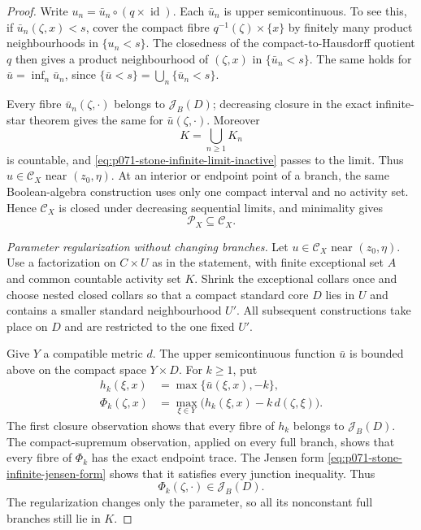 \begin{proof}
Write \(u_n=\bar u_n\circ(q\times\operatorname{id})\).  Each
\(\bar u_n\) is upper semicontinuous.  To see this, if
\(\bar u_n(\zeta,x)<s\), cover the compact fibre
\(q^{-1}(\zeta)\times\{x\}\) by finitely many product neighbourhoods in
\(\{u_n<s\}\).  The closedness of the compact-to-Hausdorff quotient
\(q\) then gives a product neighbourhood of \((\zeta,x)\) in
\(\{\bar u_n<s\}\).  The same holds for
\(\bar u=\inf_n\bar u_n\), since
\(\{\bar u<s\}=\bigcup_n\{\bar u_n<s\}\).

Every fibre \(\bar u_n(\zeta,\cdot)\) belongs to
\(\mathscr J_B(D)\); decreasing closure in the exact infinite-star
theorem gives the same for \(\bar u(\zeta,\cdot)\).  Moreover
\[
                         K=\bigcup_{n\geq1}K_n
\]
is countable, and
\eqref{eq:p071-stone-infinite-limit-inactive} passes to the limit.
Thus \(u\in\mathcal C_X\) near \((z_0,\eta)\).  At an interior or
endpoint point of a branch, the same Boolean-algebra construction uses
only one compact interval and no activity set.  Hence
\(\mathcal C_X\) is closed under decreasing sequential limits, and
minimality gives
\begin{equation}
                          \mathcal P_X\subseteq\mathcal C_X.
 \label{eq:p071-stone-infinite-minimality}
\end{equation}

\medskip\noindent
\emph{Parameter regularization without changing branches.}
Let \(u\in\mathcal C_X\) near \((z_0,\eta)\).  Use a factorization on
\(C\times U\) as in the statement, with finite exceptional set \(A\)
and common countable activity set \(K\).  Shrink the exceptional collars
once and choose nested closed collars so that a compact standard core
\(D\) lies in \(U\) and contains a smaller standard neighbourhood
\(U'\).  All subsequent constructions take place on \(D\) and are
restricted to the one fixed \(U'\).

Give \(Y\) a compatible metric \(d\).  The upper semicontinuous function
\(\bar u\) is bounded above on the compact space \(Y\times D\).  For
\(k\geq1\), put
\begin{align}
 h_k(\xi,x)&=\max\{\bar u(\xi,x),-k\},\\
 \Phi_k(\zeta,x)
   &=\max_{\xi\in Y}
       \bigl(h_k(\xi,x)-k\,d(\zeta,\xi)\bigr).
 \label{eq:p071-stone-infinite-parameter-regularization}
\end{align}
The first closure observation shows that every fibre of \(h_k\) belongs
to \(\mathscr J_B(D)\).  The compact-supremum observation, applied on
every full branch, shows that every fibre of \(\Phi_k\) has the exact
endpoint trace.  The Jensen form
\eqref{eq:p071-stone-infinite-jensen-form} shows that it satisfies every
junction inequality.  Thus
\begin{equation}
                         \Phi_k(\zeta,\cdot)\in\mathscr J_B(D).
 \label{eq:p071-stone-infinite-regularized-comparison}
\end{equation}
The regularization changes only the parameter, so all its nonconstant
full branches still lie in \(K\).


\end{proof}
